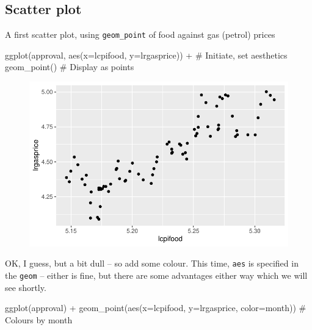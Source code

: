 \documentclass[
  letterpaper,
]{book}
\newenvironment{Shaded}{\begin{snugshade}}{\end{snugshade}}
\newcommand{\AttributeTok}[1]{\textcolor[rgb]{0.40,0.45,0.13}{#1}}
\newcommand{\CommentTok}[1]{\textcolor[rgb]{0.37,0.37,0.37}{#1}}
\newcommand{\FunctionTok}[1]{\textcolor[rgb]{0.28,0.35,0.67}{#1}}
\newcommand{\NormalTok}[1]{\textcolor[rgb]{0.00,0.23,0.31}{#1}}
\newcommand{\SpecialCharTok}[1]{\textcolor[rgb]{0.37,0.37,0.37}{#1}}
\begin{document}
\hypertarget{scatter-plot}{%
\subsection{Scatter plot}\label{scatter-plot}}

A first scatter plot, using \texttt{geom\_point} of food against gas
(petrol) prices

\begin{Shaded}
\begin{Highlighting}[]
\FunctionTok{ggplot}\NormalTok{(approval, }\FunctionTok{aes}\NormalTok{(}\AttributeTok{x=}\NormalTok{lcpifood, }\AttributeTok{y=}\NormalTok{lrgasprice)) }\SpecialCharTok{+}    \CommentTok{\# Initiate, set aesthetics}
  \FunctionTok{geom\_point}\NormalTok{()                                       }\CommentTok{\# Display as points}
\end{Highlighting}
\end{Shaded}

\begin{figure}[H]

{\centering \includegraphics{Appendix1_files/figure-pdf/p1-1.pdf}

}

\end{figure}

OK, I guess, but a bit dull -- so add some colour. This time,
\texttt{aes} is specified in the \texttt{geom} -- either is fine, but
there are some advantages either way which we will see shortly.

\begin{Shaded}
\begin{Highlighting}[]
\FunctionTok{ggplot}\NormalTok{(approval) }\SpecialCharTok{+}
  \FunctionTok{geom\_point}\NormalTok{(}\FunctionTok{aes}\NormalTok{(}\AttributeTok{x=}\NormalTok{lcpifood, }\AttributeTok{y=}\NormalTok{lrgasprice, }\AttributeTok{color=}\NormalTok{month))  }\CommentTok{\# Colours by month}
\end{Highlighting}
\end{Shaded}
\end{document}
